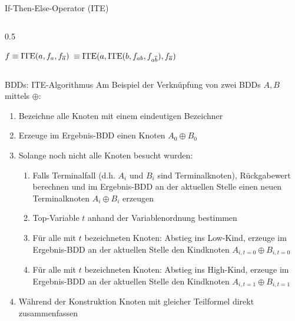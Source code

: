 \begin{frame}[c, fragile]{If-Then-Else-Operator (ITE)}
\begin{columns}[c]
\begin{column}{0.5\textwidth}
\begin{center}

				$f\equiv\textrm{ITE}(a, f_{a}, f_{\overline{a}})$ $\equiv\textrm{ITE}(a, \textrm{ITE}(b, f_{ab}, f_{a\overline{b}}), f_{\overline{a}})$
			\end{center}
		\end{column}
	\end{columns}

\end{frame}


\begin{frame}[c, fragile]{BDDs: ITE-Algorithmus}
	Am Beispiel der Verknüpfung von zwei BDDs $A, B$ mittels $\oplus$:
	\begin{enumerate}
		\item Bezeichne alle Knoten mit einem eindeutigen Bezeichner
		\item Erzeuge im Ergebnis-BDD einen Knoten $A_0 \oplus B_0$
		\item Solange noch nicht alle Knoten besucht wurden:
		      \begin{enumerate}
			      \item Falls Terminalfall (d.h. $A_i$ und $B_i$ sind Terminalknoten), Rückgabewert berechnen und im Ergebnis-BDD an der aktuellen Stelle einen neuen Terminalknoten $A_i \oplus B_i$  erzeugen
			      \item Top-Variable $t$ anhand der Variablenordnung bestimmen
			      \item Für alle mit $t$ bezeichneten Knoten: Abstieg ins Low-Kind, erzeuge im Ergebnis-BDD an der aktuellen Stelle den Kindknoten $A_{i, t=0} \oplus B_{i, t=0}$
			      \item Für alle mit $t$ bezeichneten Knoten: Abstieg ins High-Kind, erzeuge im Ergebnis-BDD an der aktuellen Stelle den Kindknoten $A_{i, t=1} \oplus B_{i, t=1}$
		      \end{enumerate}
		\item Während der Konstruktion Knoten mit gleicher Teilformel direkt zusammenfassen
	\end{enumerate}
\end{frame}


